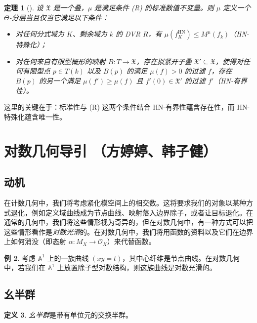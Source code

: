 \documentclass{amsart}
\newtheorem{thm}{定理}[section]
\theoremstyle{definition}
\newtheorem{defn}[thm]{定义}
\newtheorem{exm}[thm]{例}
\theoremstyle{remark}
\theoremstyle{plain}
\theoremstyle{definition}
\theoremstyle{remark}
\newcommand{\A}{\mathbb{A}}
\newcommand{\mc}[1]{\mathcal{#1}}
\newcommand{\mf}[1]{\mathfrak{#1}}
\newcommand{\mr}[1]{\mathrm{#1}}
\newcommand{\1}{\mathbf{1}}
\newcommand{\2}{\mathbf{2}}
\newcommand{\3}{\mathbf{3}}
\begin{document}
\begin{thm}[{\cite{HLinstability}}]
    设 \(\mf{X}\) 是一个叠，\(\mu\) 是满足条件 (R) 的标准数值不变量。则 \(\mu\) 定义一个 \(\Theta\)-分层当且仅当它满足以下条件：
    \begin{itemize}
        \item 对任何分式域为 \(K\)、剩余域为 \(k\) 的 DVR \(R\)，有 \(\mu(f_K^{\mr{HN}}) \leq M^{\mu}(f_k)\)（HN-特殊化）；
        \item 对任何来自有限型概形的映射 \(B \colon T \to \mf{X}\)，存在拟紧开子叠 \(\mf{X}' \subseteq \mf{X}\)，使得对任何有限型点 \(p \in T(k)\) 以及 \(B(p)\) 的满足 \(\mu(f) > 0\) 的过滤 \(f\)，存在 \(B(p)\) 的另一个满足 \(\mu(f') \geq \mu(f)\) 且 \(f'(0) \in \mf{X}'\) 的过滤 \(f'\)（HN-有界性）。
    \end{itemize}
\end{thm}

这里的关键在于：标准性与 (R) 这两个条件结合 HN-有界性蕴含存在性，而 HN-特殊化蕴含唯一性。\section{对数几何导引 （方婷婷、韩子健）}%
\label{sec:Intro to log geometry (Tingting Fang and Zijian Han)}

\subsection{动机}%
\label{sub:Motivation}

在计数几何中，我们将考虑紧化模空间上的相交数。这将要求我们的对象以某种方式退化，例如定义域曲线成为节点曲线、映射落入边界除子，或者让目标退化。在通常的几何中，我们将这些情形视为奇异的，但在对数几何中，有一种方式可以把这些情形看作是\textit{对数光滑}的。在对数几何中，我们将用函数的资料以及它们在边界上如何消没（即态射 \(\alpha \colon M_X \to \mc{O}_X\)）来代替函数。

\begin{exm}
    考虑 \(\A^1\) 上的一族曲线 \((xy=t)\)，其中心纤维是节点曲线。在对数几何中，若我们在 \(\A^1\) 上放置除子型对数结构，则这族曲线是对数光滑的。
\end{exm}

\subsection{幺半群}%
\label{sub:Monoids}

\begin{defn}
    \textit{幺半群}是带有单位元的交换半群。
\end{defn}
\end{document}
